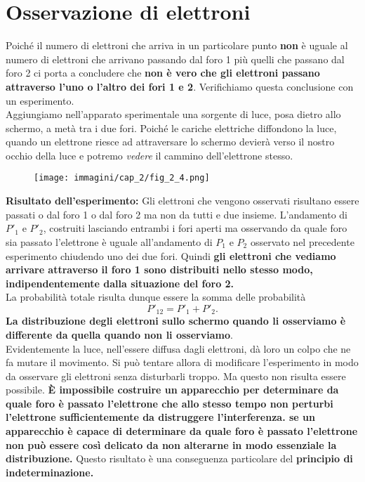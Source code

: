 \documentclass[a4paper,12pt,oneside]{book}
\begin{document}
\section*{Osservazione di elettroni}
Poiché il numero di elettroni che arriva in un particolare punto \textbf{non} è uguale al numero di elettroni che arrivano passando dal foro 1 più quelli che passano dal foro 2 ci porta a concludere che \textbf{non è vero che gli elettroni passano attraverso l'uno o l'altro dei fori 1 e 2}. Verifichiamo questa conclusione con un esperimento.\\
Aggiungiamo nell'apparato sperimentale una sorgente di luce, posa dietro allo schermo, a metà tra i due fori. Poiché le cariche elettriche diffondono la luce, quando un elettrone riesce ad attraversare lo schermo devierà verso il nostro occhio della luce e potremo \textit{vedere} il cammino dell'elettrone stesso.
\newpage
\begin{figure}[!htbp]
\begin{center}
\texttt{[image: immagini/cap\_2/fig\_2\_4.png]}
\end{center}
\end{figure}
\textbf{Risultato dell'esperimento:} Gli elettroni che vengono osservati risultano essere passati o dal foro 1 o dal foro 2 ma non da tutti e due insieme. L'andamento di $P'_1$ e $P'_2$, costruiti lasciando entrambi i fori aperti ma osservando da quale foro sia passato l'elettrone è uguale all'andamento di $P_1$ e $P_2$ osservato nel precedente esperimento chiudendo uno dei due fori. Quindi \textbf{gli elettroni che vediamo arrivare attraverso il foro 1 sono distribuiti nello stesso modo, indipendentemente dalla situazione del foro 2.}\\
La probabilità totale risulta dunque essere la somma delle probabilità
\begin{equation}
P'_{12}= P'_1 + P'_2.
\end{equation}
\textbf{La distribuzione degli elettroni sullo schermo quando li osserviamo è differente da quella quando non li osserviamo}.\\
Evidentemente la luce, nell'essere diffusa dagli elettroni, dà loro un colpo che ne fa mutare il movimento. Si può tentare allora di modificare l'esperimento in modo da osservare gli elettroni senza disturbarli troppo. Ma questo non risulta essere possibile. \textbf{È impossibile costruire un apparecchio per determinare da quale foro è passato l'elettrone che allo stesso tempo non perturbi l'elettrone sufficientemente da distruggere l'interferenza. se un apparecchio è capace di determinare da quale foro è passato l'elettrone  non può essere così delicato da non alterarne in modo essenziale la distribuzione.} Questo risultato è una conseguenza particolare del \textbf{principio di indeterminazione.}
\end{document}
